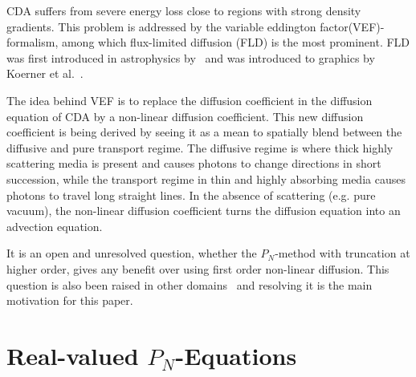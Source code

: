 CDA suffers from severe energy loss close to regions with strong density gradients. This problem is addressed by the variable eddington factor(VEF)-formalism, among which flux-limited diffusion (FLD) is the most prominent. FLD was first introduced in astrophysics by~\cite{Levermore81} and was introduced to graphics by Koerner et al.~\cite{Koerner14}.

The idea behind VEF is to replace the diffusion coefficient in the diffusion equation of CDA by a non-linear diffusion coefficient. This new diffusion coefficient is being derived by seeing it as a mean to spatially blend between the diffusive and pure transport regime. The diffusive regime is where thick highly scattering media is present and causes photons to change directions in short succession, while the transport regime in thin and highly absorbing media causes photons to travel long straight lines. In the absence of scattering (e.g. pure vacuum), the non-linear diffusion coefficient turns the diffusion equation into an advection equation.

It is an open and unresolved question, whether the $P_N$-method with truncation at higher order, gives any benefit over using first order non-linear diffusion. This question is also been raised in other domains~\cite{Olson00} and resolving it is the main motivation for this paper.
 






\section{Real-valued $P_N$-Equations}
\label{sec:pnequations}

